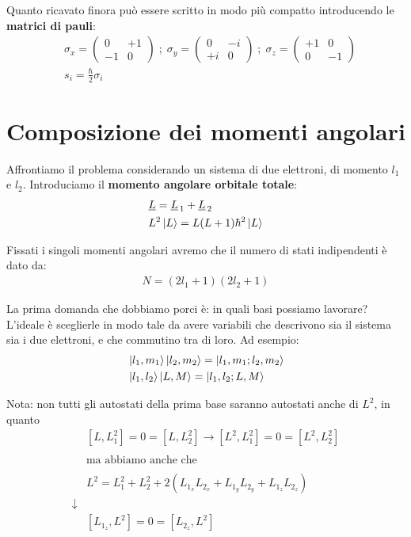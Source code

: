 Quanto ricavato finora può essere scritto in modo più compatto introducendo le \textbf{matrici di pauli}:
\begin{align}
{}&\sigma_x = \left(
\begin{array}{ccc}
0 & +1 \\
-1 & 0
\end{array}
\right) \; ; \;
\sigma_y = \left(
\begin{array}{ccc}
0 & -i \\
+i & 0
\end{array}
\right) \; ; \;
\sigma_z = \left(
\begin{array}{ccc}
+1 & 0 \\
0 & -1
\end{array}
\right) \\
&s_i= \frac{\hbar}{2}\sigma_i
\end{align}

\section{Composizione dei momenti angolari}

Affrontiamo il problema considerando un sistema di due elettroni, di momento $l_1$ e $l_2$. Introduciamo il \textbf{momento angolare orbitale totale}:
\begin{align}
{}&\underline{L}=\underline{L}_{\, 1} + \underline{L}_{\, 2} \\
&L^2\ket{L} = L(L+1)\hbar^2\ket{L}
\end{align}

Fissati i singoli momenti angolari avremo che il numero di stati indipendenti è dato da:
\begin{align}
N=(2l_1 + 1)(2l_2 + 1)
\end{align}

La prima domanda che dobbiamo porci è: in quali basi possiamo lavorare? L'ideale è sceglierle in modo tale da avere variabili che descrivono sia il sistema sia i due elettroni, e che commutino tra di loro. Ad esempio:
\begin{align}
{}&\ket{l_1,m_1}\ket{l_2,m_2}=\ket{l_1,m_1; l_2,m_2} \\
&\ket{l_1,l_2}\ket{L,M}= \ket{l_1,l_2; L,M}
\end{align}

Nota: non tutti gli autostati della prima base saranno autostati anche di $L^2$, in quanto
\begin{align}
{}&[L,L_1^2]=0=[L,L_2^2] \rightarrow [L^2,L_1^2]=0=[L^2,L_2^2] \\
\nonumber \\
&\text{ma abbiamo anche che} \nonumber \\
\nonumber \\
&L^2= L_1^2 + L_2^2 + 2(L_{1_x}L_{2_x} + L_{1_y}L_{2_y} + L_{1_z}L_{2_z})\nonumber \\
\downarrow \nonumber \\
&[L_{1_z},L^2]=0=[L_{2_z},L^2]
\end{align}


